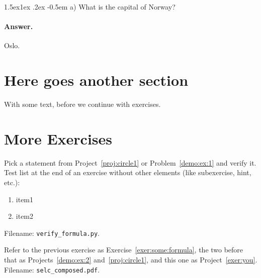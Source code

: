 \documentclass[%
oneside,                 %
final,                   %
10pt]{article}
\makeatletter
\newenvironment{doconceexercise}{}{}
\newcounter{doconceexercisecounter}
\newcommand\subex{\@startsection{paragraph}{4}{\z@}%
                  {1.5ex\@plus1ex \@minus.2ex}%
                  {-0.5em}%
                  {\normalfont\normalsize\bfseries}}
\theoremstyle{definition}
\makeatother
\begin{document}
\begin{enumerate}
\begin{doconceexercise}
\end{doconceexercise}
\begin{doconceexercise}
                             
\subex{a)}
What is the capital of Norway?
\paragraph{Answer.}
Oslo.
\end{doconceexercise}
\section{Here goes another section}
With some text, before we continue with exercises.
\section{More Exercises}
\begin{doconceexercise}
                             
\label{exer:some:formula}
Pick a statement from Project~\vref{proj:circle1} or Problem~\vref{demo:ex:1}
and verify it.
Test list at the end of an exercise without other elements (like subexercise,
hint, etc.):
\begin{enumerate}
\item item1
\item item2
\end{enumerate}
\noindent
\noindent Filename: \Verb!verify_formula.py!.
\end{doconceexercise}
\begin{doconceexercise}
                             
\label{exer:you}
Refer to the previous exercise as Exercise~\vref{exer:some:formula},
the two before that as Projects~\vref{demo:ex:2} and~\vref{proj:circle1},
and this one as Project~\vref{exer:you}.
\noindent Filename: \Verb!selc_composed.pdf!.
\end{doconceexercise}


\appendix

\end{enumerate}
\end{document}

